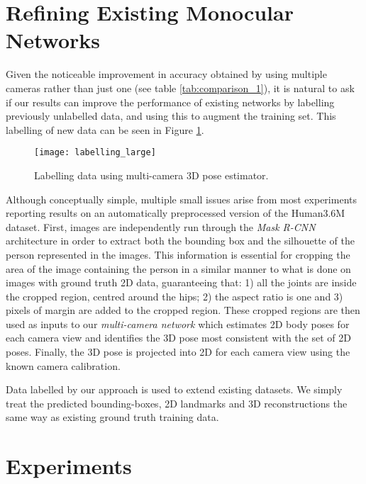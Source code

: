 \documentclass[10pt,twocolumn,letterpaper]{article}
\begin{document}
\section{Refining Existing Monocular Networks}
Given the noticeable improvement in accuracy obtained by using
multiple cameras rather than just one (see table
\ref{tab:comparison_1}), it is natural to ask if our results can
improve the performance of existing networks by labelling
previously unlabelled data, and using this to augment the training
set. This labelling of new data can be seen in Figure
 \ref{fig:labelling}.  


\begin{figure}[t]
  \texttt{[image: labelling\_large]}
  \caption{Labelling data using multi-camera 3D pose
   estimator.\label{fig:labelling}}
\end{figure}
Although conceptually simple, multiple small issues arise
from most experiments reporting results on an automatically
preprocessed version of the Human3.6M dataset.
   First, images are independently run through the
 \emph{Mask R-CNN} architecture \cite{he2017mask} in order to extract
 both the bounding box and the silhouette of the person represented in
 the images. This information is essential for cropping the area of
 the image containing the person in a similar manner to what is done
 on images with ground truth 2D data, guaranteeing that: 1) all the
 joints are inside the cropped region, centred around the hips; 2)
 the aspect ratio is one and 3)  pixels of margin are added to the
 cropped region. These cropped regions are then used as inputs to our
 \emph{multi-camera network} which estimates 2D body poses for each 
 camera view and identifies the 3D pose most consistent with the set
 of 2D poses.  Finally, the 3D pose is projected into 2D for each 
 camera view using the known camera calibration.

 Data labelled by our approach is used to extend existing datasets. We
 simply treat the predicted bounding-boxes, 2D landmarks and 3D
 reconstructions the same way as  existing ground truth training
 data.
 
 \section{Experiments}
\label{sec:results}
\end{document}
